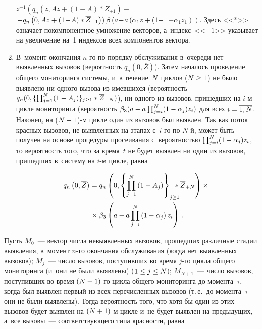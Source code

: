 \begin{multicols}{2}
\begin{enumerate}
$z^{-1} \left( q_n\left(z, Az+(1-A) *\overline{Z}_{+1}\right) -\right.$\linebreak
$\left.-q_n\left( 0, Az+(1\!\hm-\!A)* \overline{Z}_{+1}\right)\right)
 \beta\left( a\hm\!-\!a\left( \alpha_1z+(1-\right.\right.$\linebreak
 $\left.\left.-\alpha_1z_1\right)
 \right)$.
  Здесь <<*>> означает покомпонентное умножение векторов, 
а~индекс~<<$+1$>> указывает на увеличение на~1 индексов всех компонентов 
вектора.
  \item  В~момент окончания $n$-го по порядку обслуживания в~очереди нет 
выявленных вызовов (вероятность $q_n(0,\overline{Z})$). Затем началось 
проведение общего мониторинга системы, и~в течение~$N$~циклов ($N\hm\geq 
1$) не было выявлено ни одного вызова из имевшихся (вероятность 
$q_n(0,\{\prod\nolimits^N_{j=1} (1\hm-A_j)\}_{j\geq1} * \overline{Z}_{+N})$), 
ни одного из вызовов, пришедших на $i$-м цикле мониторинга (вероятность 
$\beta_3(a\hm- a\prod\nolimits^N_{j=i} (1\hm- \alpha_j)z_i)$ для всех $i\hm= 
\overline{1,N}$. Наконец, на ($N\hm+1$)-м цикле один из вызовов был выявлен. 
Так как поток красных вызовов, не выявленных на этапах с~$i$-го по $N$-й, 
может быть получен на основе процедуры просеивания с~вероятностью 
$\prod\nolimits^N_{j=i} (1\hm- \alpha_j)z_i$, то вероятность того, что за 
время~$t$ не будет выявлен ни один из вызовов, пришедших в~сис\-те\-му на $i$-м 
цикле, равна

\vspace*{-10pt}

\noindent
\begin{multline*}
  \hspace*{-1pt}q_n\left(0,\overline{Z}\right) =q_n\left(0, \left\{ \prod\limits^N_{j=1} \left(1-
A_j\right)\right\}_{j\geq1}\hspace*{-9pt} * \overline{Z}_{+N}\right) \times{}\\
{}\times\beta_3 \left( 
a-a\prod\limits^N_{j=i} \left(1-\alpha_j\right) z_i\right)\,.
\end{multline*}
  \end{enumerate}
  
  \vspace*{-6pt}
  
  Пусть $\overline{M_0}$~--- вектор числа невыявленных вызовов, прошедших 
различные стадии выявления, в~момент $n$-го окончания обслуживания (когда 
нет выявленных вызовов); $M_j$~--- число вызовов, поступивших во время  
$j$-го цикла общего мониторинга (и~они не были выявлены) ($1\hm\leq j\hm\leq 
N$); $M_{N+1}$~--- число вызовов, поступивших во время $(N\hm+1)$-го 
цикла общего мониторинга до момента~$\tau$, когда был выявлен первый из 
всех перечисленных вызовов (т.\,е.\ до момента~$\tau$ они не были выявлены). 
Тогда вероятность того, что хотя бы один из этих вызовов будет выявлен на 
$(N\hm+1)$-м цикле и~не будет выявлен на предыдущих, а~все вызовы~--- 
соответствующего типа красности, равна 


\end{multicols}
